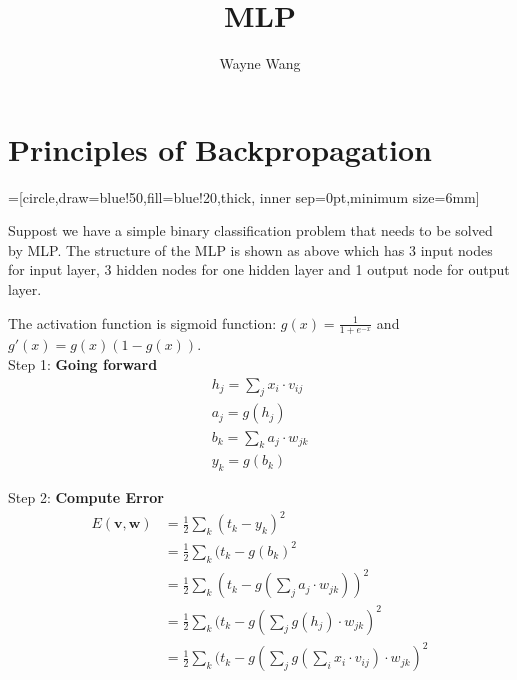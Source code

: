 \documentclass[UTF-8]{article}
\title{MLP}
\author{Wayne Wang}
\date{}
\begin{document}
\maketitle
\section{Principles of Backpropagation}

=[circle,draw=blue!50,fill=blue!20,thick,
inner sep=0pt,minimum size=6mm]
\begin{center}
\end{center}

Suppost we have a simple binary classification problem that
needs to be solved by MLP. The structure of the MLP is shown as
above which has 3 input nodes for input layer, 3 hidden nodes
for one hidden layer and 1 output node for output layer.

The activation function is sigmoid function:
$g(x)=\frac{1}{1+e^{-x}}$ and $g'(x)=g(x)(1-g(x))$.
\\

Step 1: \textbf{Going forward}
\begin{gather}
  h_j = \sum_j x_i\cdot v_{ij}\\
  a_j = g(h_j)\\
  b_k = \sum_k a_j\cdot w_{jk}\\
  y_k = g(b_k)
\end{gather}

Step 2: \textbf{Compute Error}
\begin{equation}
  \begin{split}
  E(\textbf{v},\textbf{w})
  &=\frac{1}{2} \sum_k (t_k-y_k)^2\\
  &=\frac{1}{2} \sum_k (t_k-g(b_k)^2\\
  &=\frac{1}{2} \sum_k (t_k-g(\sum_j a_j\cdot w_{jk}))^2\\
  &=\frac{1}{2} \sum_k (t_k-g(\sum_j g(h_j)\cdot w_{jk})^2\\
  &=\frac{1}{2} \sum_k (t_k-g(\sum_j g(\sum_i x_i\cdot v_{ij})\cdot w_{jk})^2\\
\end{split}
\end{equation}
\end{document}
